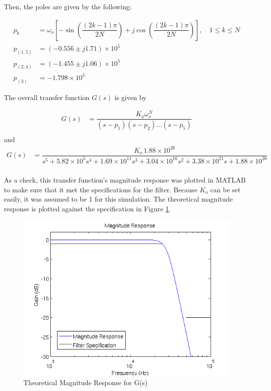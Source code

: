 Then, the poles are given by the following:

\begin{align*}
p_k &= \omega_o \left[ -\sin{\left(\dfrac{(2k-1)\pi}{2N}\right) } + j\cos{\left(\dfrac{(2k-1)\pi}{2N}\right)} \right],\quad 1\le k \le N \\
p_{(1,5)} &= (-0.556 \pm j1.71) \times 10^5\\
p_{(2,4)} &= (-1.455 \pm j1.06) \times 10^5\\
p_{(3)} &= -1.798 \times 10^5
\end{align*}

The overall transfer function $G(s)$ is given by

\begin{align*}
G(s) &= \dfrac{K_o \omega_o^N}{(s-p_1)(s-p_2)\ldots(s-p_5)}\\
\end{align*}
and
\begin{align*}
G(s) &= \dfrac{K_o\, 1.88 \times 10^{26}}{s^5 + 5.82\times 10^5 s^4 + 1.69\times 10^{11} s^3 + 3.04\times 10^{16} s^2 + 3.38\times 10^{21} s + 1.88 \times 10^{26}}\\
\end{align*}

As a check, this transfer function's magnitude response was plotted in MATLAB to make sure that it met the specifications for the filter. Because $K_o$ can be set easily, it was assumed to be 1 for this simulation. The theoretical magnitude response is plotted against the specification in Figure \ref{fig:theo}.

\begin{figure}[H]
\centering
\includegraphics[scale=.75]{fig/mag_theo.png}
\caption{Theoretical Magnitude Response for G(s)\label{fig:theo}}
\end{figure}

